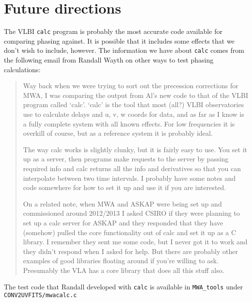 \documentclass[11pt, oneside]{article}   	%
\begin{document}
\section{Future directions}
The VLBI \texttt{calc} program is probably the most accurate code available for comparing phasing against. It is possible that it  includes some effects that we don't wish to include, however. The information we have about \texttt{calc} comes from the following email from Randall Wayth on other ways to test phasing calculations:
\begin{quotation}
Way back when we were trying to sort out the precession corrections for MWA, I was comparing the output from Al's new code to that of the VLBI program called `calc'. `calc' is the tool that most (all?) VLBI observatories use to calculate delays and u, v, w coords for data, and as far as I know is a fully complete system with all known effects. For low frequencies it is overkill of course, but as a reference system it is probably ideal.

The way calc works is slightly clunky, but it is fairly easy to use. You set it up as a server, then programs make requests to the server by passing required info and calc returns all the info and derivatives so that you can interpolate between two time intervals. I probably have some notes and code somewhere for how to set it up and use it if you are interested.

On a related note, when MWA and ASKAP were being set up and commissioned around 2012/2013 I asked CSIRO if they were planning to set up a calc server for ASKAP and they responded that they have (somehow) pulled the core functionality out of calc and set it up as a C library. I remember they sent me some code, but I never got it to work and they didn't respond when I asked for help. But there are probably other examples of good libraries floating around if you're willing to ask. Presumably the VLA has a core library that does all this stuff also.
\end{quotation}

The test code that Randall developed with \texttt{calc} is available in \verb!MWA_tools! under \verb!CONV2UVFITS/mwacalc.c!
\end{document}
